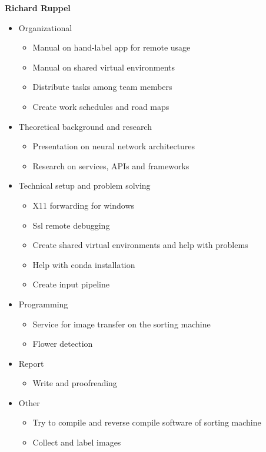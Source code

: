 \bigskip
\textbf{Richard Ruppel}
\begin{itemize}
	\item Organizational
	\begin{itemize}
		\item Manual on hand-label app for remote usage
		\item Manual on shared virtual environments
		\item Distribute tasks among team members
		\item Create work schedules and road maps
	\end{itemize}
	\item Theoretical background and research
	\begin{itemize}
		\item Presentation on neural network architectures
		\item Research on services, APIs and frameworks
	\end{itemize}
	\item Technical setup and problem solving
	\begin{itemize}
		\item X11 forwarding for windows
		\item Ssl remote debugging
		\item Create shared virtual environments and help with problems
		\item Help with conda installation
		\item Create input pipeline
	\end{itemize}
	\item Programming
	\begin{itemize}
		\item Service for image transfer on the sorting machine
		\item Flower detection
	\end{itemize}
	\item Report
	\begin{itemize}
		\item Write and proofreading
	\end{itemize}
	\item Other
	\begin{itemize}
		\item Try to compile and reverse compile software of sorting machine
		\item Collect and label images
	\end{itemize}
\end{itemize}

